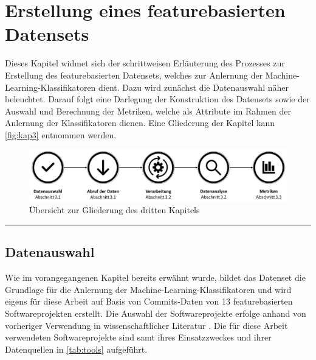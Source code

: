 
\chapter{Erstellung eines featurebasierten Datensets}
\label{dataset-creation}

Dieses Kapitel widmet sich der schrittweisen Erläuterung des Prozesses zur Erstellung des featurebasierten Datensets, welches zur Anlernung der Machine-Learning-Klassifikatoren dient. Dazu wird zunächst die Datenauswahl näher beleuchtet. Darauf folgt eine Darlegung der Konstruktion des Datensets sowie der Auswahl und Berechnung der Metriken, welche als Attribute im Rahmen der Anlernung der Klassifikatoren dienen. Eine Gliederung der Kapitel kann \autoref{fig:kap3} entnommen werden.

\begin{figure}[H]
    \centering
    \includegraphics[width=\textwidth]{images/Kap3}
    \caption{Übersicht zur Gliederung des dritten Kapitels\label{fig:kap3}}
\end{figure}

\hrule

\section{Datenauswahl}

Wie im vorangegangenen Kapitel bereits erwähnt wurde, bildet das Datenset die Grundlage für die Anlernung der Machine-Learning-Klassifikatoren und wird eigens für diese Arbeit auf Basis von Commits-Daten von 13 featurebasierten Softwareprojekten erstellt. Die Auswahl der Softwareprojekte erfolge anhand von vorheriger Verwendung in wissenschaftlicher Literatur \cite{Hunsen2015,Liebig2010,Queiroz2015,Queiroz2016}. Die für diese Arbeit verwendeten Softwareprojekte sind samt ihres Einsatzzweckes und ihrer Datenquellen in \autoref{tab:tools} aufgeführt.

